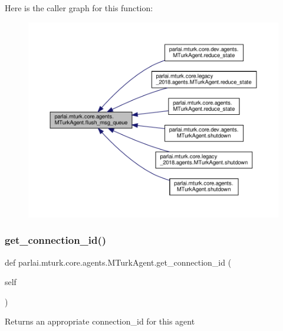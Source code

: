 Here is the caller graph for this function\+:
\nopagebreak
\begin{figure}[H]
\begin{center}
\leavevmode
\includegraphics[width=350pt]{classparlai_1_1mturk_1_1core_1_1agents_1_1MTurkAgent_a7e522f68c78685e18b602f7579acce9d_icgraph}
\end{center}
\end{figure}
\mbox{\label{classparlai_1_1mturk_1_1core_1_1agents_1_1MTurkAgent_a67b1c261cecdb746af6ce5d545db37ab}} 
\subsubsection{\texorpdfstring{get\+\_\+connection\+\_\+id()}{get\_connection\_id()}}
{\footnotesize\ttfamily def parlai.\+mturk.\+core.\+agents.\+M\+Turk\+Agent.\+get\+\_\+connection\+\_\+id (\begin{DoxyParamCaption}\item[{}]{self }\end{DoxyParamCaption})}

\begin{DoxyVerb}Returns an appropriate connection_id for this agent\end{DoxyVerb}
 

